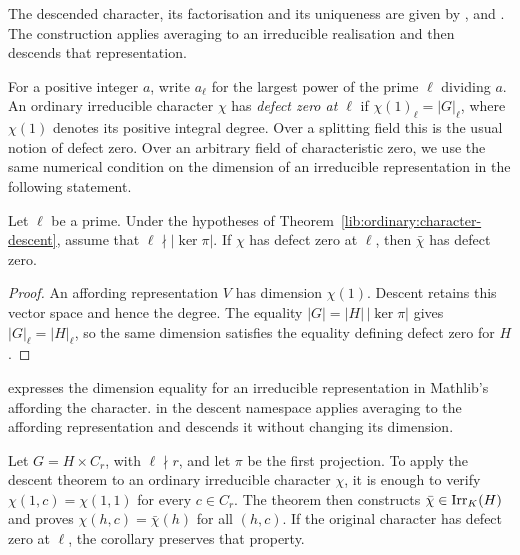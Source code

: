\begin{implementation}
The descended character, its factorisation and its uniqueness are given by
,
 and .
The construction applies averaging to an irreducible realisation and
then descends that representation.
\end{implementation}

For a positive integer $a$, write $a_\ell$ for the largest power of the
prime $\ell$ dividing $a$. An ordinary irreducible character $\chi$ has
\emph{defect zero at $\ell$} if $\chi(1)_\ell=|G|_\ell$, where
$\chi(1)$ denotes its positive integral degree.
Over a splitting field this is the usual notion of defect zero. Over an
arbitrary field of characteristic zero, we use the same numerical
condition on the dimension of an irreducible representation in the
following statement.

\begin{corollary}
\label{lib:ordinary:defect-descent}
Let $\ell$ be a prime. Under the hypotheses of
Theorem~\ref{lib:ordinary:character-descent}, assume that $\ell\nmid|\ker \pi|$.
If $\chi$ has defect zero at $\ell$, then $\bar\chi$ has defect zero.
\end{corollary}
\begin{proof}
An affording representation $V$ has dimension $\chi(1)$. Descent retains
this vector space and hence the degree.
The equality $|G|=|H|\,|\ker \pi|$ gives $|G|_\ell=|H|_\ell$, so the same
dimension satisfies the equality defining defect zero for $H$.
\end{proof}

\begin{implementation}
 expresses the dimension
equality for an irreducible representation in Mathlib's 
affording the character.
 in the descent namespace applies
averaging to the affording representation and descends it without changing
its dimension.
\end{implementation}

\begin{example}
Let $G=H\times C_r$, with $\ell\nmid r$, and let $\pi$ be the first
projection. To apply the descent theorem to an ordinary irreducible
character $\chi$, it is enough to verify
$\chi(1,c)=\chi(1,1)$ for every $c\in C_r$. The theorem then constructs
$\bar\chi\in\operatorname{Irr}_K(H)$ and proves
$\chi(h,c)=\bar\chi(h)$ for all $(h,c)$. If the original character has
defect zero at $\ell$, the corollary preserves that property.
\end{example}

